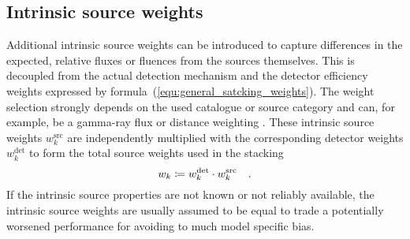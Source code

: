 \subsection{Intrinsic source weights}
Additional intrinsic source weights can be introduced to capture differences in the expected, relative fluxes or fluences from the sources themselves.
This is decoupled from the actual detection mechanism and the detector efficiency weights expressed by formula~(\ref{equ:general_satcking_weights}).
The weight selection strongly depends on the used catalogue or source category and can, for example, be a gamma-ray flux or distance weighting \cite{Huber:2017wxt,Aartsen:2016lir}.
These intrinsic source weights $w_k^\text{src}$ are independently multiplied with the corresponding detector weights $w_k^\text{det}$ to form the total source weights used in the stacking
\begin{equation}
  w_k \coloneqq w_k^\text{det} \cdot w_k^\text{src}
  \quad\text{.}
\end{equation}
If the intrinsic source properties are not known or not reliably available, the intrinsic source weights are usually assumed to be equal to trade a potentially worsened performance for avoiding to much model specific bias.

